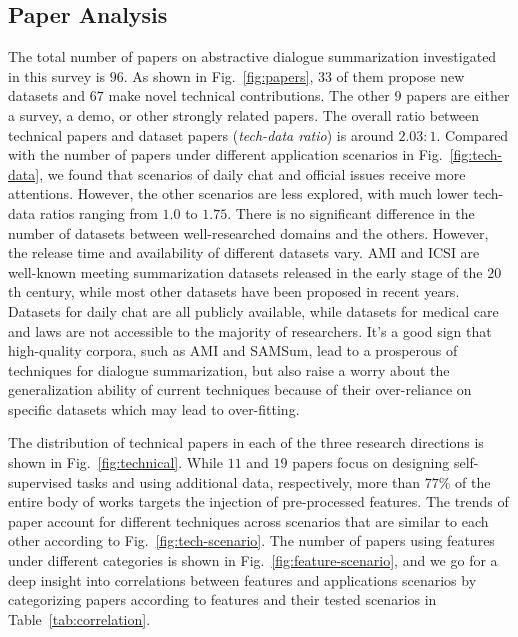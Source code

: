 \subsection{Paper Analysis}\label{sec:observations}
The total number of papers on abstractive dialogue summarization investigated 
in this survey is $96$. 
As shown in Fig.~\ref{fig:papers}, $33$ of them propose new datasets and 
$67$ make novel technical contributions. The other $9$ papers are either 
a survey, a demo, or other strongly related papers. 
The overall ratio between technical papers and dataset papers 
(\textit{tech-data ratio}) is around $2.03:1$. Compared with the number of 
papers under different application scenarios in Fig.~\ref{fig:tech-data}, 
we found that scenarios of daily chat and official issues receive more 
attentions.
However, the other scenarios are less explored, with much lower 
tech-data ratios ranging from $1.0$ to $1.75$.
There is no significant difference in the number of datasets between
well-researched domains and the others. However, the release time and availability of different datasets vary.
AMI and ICSI are well-known meeting summarization datasets released in the early stage of the $20$th century, while most other datasets have been proposed in recent years.
Datasets for daily chat are all publicly available, while datasets for medical care and laws are not accessible to the majority of researchers. It's a good sign that high-quality corpora, such as AMI and SAMSum, lead to a prosperous of techniques for dialogue summarization, but also raise a worry about the generalization ability of current techniques because of their over-reliance on specific datasets which may lead to over-fitting.


The distribution of technical papers in each of the three research directions 
is shown in Fig.~\ref{fig:technical}.
While $11$ and $19$ papers focus on designing self-supervised tasks and 
using additional data, respectively, 
more than $77\%$ of the entire body of works targets the injection of 
pre-processed features. The trends of paper account for different techniques 
across scenarios that are similar to each other according to Fig.~\ref{fig:tech-scenario}.
The number of papers using features under different categories is 
shown in Fig.~\ref{fig:feature-scenario}, and we go for a deep insight into 
correlations between features and applications scenarios by categorizing 
papers according to features and their tested scenarios in 
Table~\ref{tab:correlation}. 

